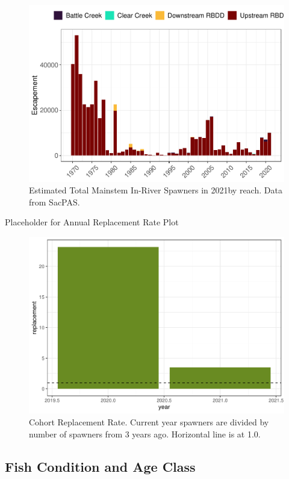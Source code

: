 \documentclass[
]{book}
\theoremstyle{definition}
\theoremstyle{definition}
\theoremstyle{definition}
\theoremstyle{definition}
\theoremstyle{remark}
\begin{document}
\begin{figure}
\centering
\includegraphics{_main_files/figure-latex/unnamed-chunk-7-1.pdf}
\caption{\label{fig:unnamed-chunk-7}Estimated Total Mainstem In-River Spawners in 2021by reach. Data from SacPAS.}
\end{figure}

Placeholder for Annual Replacement Rate Plot

\begin{figure}
\centering
\includegraphics{_main_files/figure-latex/cohortreplacement-fig-1.pdf}
\caption{\label{fig:cohortreplacement-fig}Cohort Replacement Rate. Current year spawners are divided by number of spawners from 3 years ago. Horizontal line is at 1.0.}
\end{figure}

\hypertarget{fish-condition-and-age-class}{%
\subsection{Fish Condition and Age Class}\label{fish-condition-and-age-class}}
\end{document}
